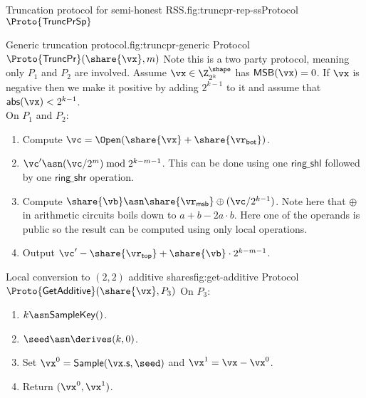 \begin{Boxfig}{Truncation protocol for semi-honest
RSS.}{fig:truncpr-rep-ss}{Protocol $\Proto{\mathsf{TruncPrSp}}$}
\end{Boxfig}

\begin{Boxfig}{Generic truncation protocol.}{fig:truncpr-generic}
  {Protocol $\Proto{\mathsf{TruncPr}}(\share{\vx}, m)$}
  Note this is a two party protocol, meaning only $P_1$ and $P_2$ are involved.
  Assume $\vx \in \Z_{2^k}^{\shape}$ has $\mathsf{MSB}(\vx) = 0$. If $\vx$ is negative then
  we make it positive by adding $2^{k-1}$ to it and assume that $\mathsf{abs}(\vx) < 2^{k-1}$.
  \\
  On $P_1$ and $P_2$:
  \begin{enumerate}
    \item Compute $\vc = \Open(\share{\vx} + \share{\vr_{\mathsf{bot}}})$.
    \item $\vc' \asn (\vc/2^m) \bmod 2^{k-m-1}$. This can be done using one $\mathsf{ring\_shl}$
    followed by one $\mathsf{ring\_shr}$ operation.
    \item Compute $\share{\vb} \asn \share{\vr_{\mathsf{msb}}} \oplus (\vc / 2^{k-1})$. Note here that $\oplus$
    in arithmetic circuits boils down to $a + b - 2a\cdot b$. Here one of the operands is public so
    the result can be computed using only local operations.
    \item Output $\vc' - \share{\vr_{\mathsf{top}}} + \share{\vb} \cdot 2^{k-m-1}$.
 \end{enumerate}

\end{Boxfig}


\begin{Boxfig}{Local conversion to $(2,2)$ additive shares}{fig:get-additive}
  {Protocol $\Proto{\mathsf{GetAdditive}}(\share{\vx}, P_3)$}
  On $P_3$:
  \begin{enumerate}
    \item $k \asn \mathsf{SampleKey}()$.
    \item $\seed \asn \derives(k, 0)$.
    \item Set $\vx^0 = \mathsf{Sample}(\vx.\mathsf{s}, \seed)$ and $\vx^1 = \vx - \vx^0$.
    \item Return $(\vx^0, \vx^1)$.
  \end{enumerate}

\end{Boxfig}

